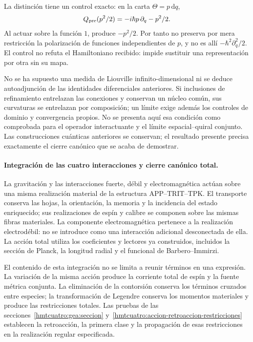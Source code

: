 La distinción tiene un control exacto: en la carta
\(\Theta=p\,\mathrm dq\),
\begin{equation}
 Q_{\rm pre}(p^2/2)=-i\hbar p\,\partial_q-p^2/2.
 \label{hmtcuatro:control-polarizacion}
\end{equation}
Al actuar sobre la función \(1\), produce \(-p^2/2\).
Por tanto no preserva por mera restricción la polarización de
funciones independientes de \(p\), y no es allí
\(-\hbar^2\partial_q^2/2\). El control no refuta el Hamiltoniano
recibido: impide sustituir una representación por otra sin su mapa.

No se ha supuesto una medida de Liouville infinito-dimensional ni
se deduce autoadjunción de las identidades diferenciales anteriores.
Si inclusiones de refinamiento entrelazan las conexiones y conservan
un núcleo común, sus curvaturas se entrelazan por composición; un
límite exige además los controles de dominio y convergencia propios.
No se presenta aquí esa condición como comprobada para el operador
interactuante y el límite espacial--quiral conjunto. Las construcciones
cuánticas anteriores se conservan; el resultado presente precisa
exactamente el cierre canónico que se acaba de demostrar.

\paragraph{Integración de las cuatro interacciones y cierre canónico total.}
La gravitación y las interacciones fuerte, débil y electromagnética
actúan sobre una misma realización material de la estructura
APP--TRIT--TPK. El transporte conserva las hojas, la orientación,
la memoria y la incidencia del estado enriquecido; sus realizaciones
de espín y calibre se componen sobre las mismas fibras materiales.
La componente electromagnética pertenece a la realización
electrodébil: no se introduce como una interacción adicional
desconectada de ella. La acción total utiliza los coeficientes y
lectores ya construidos, incluidos la sección de Planck, la longitud
radial y el funcional de Barbero--Immirzi.

El contenido de esta integración no se limita a reunir términos en
una expresión. La variación de la misma acción produce la corriente
total de espín y la fuente métrica conjunta. La eliminación de la
contorsión conserva los términos cruzados entre especies; la
transformación de Legendre conserva los momentos materiales y
produce las restricciones totales. Las pruebas de las
secciones~\ref{hmtcuatro:gea:seccion}
y~\ref{hmtcuatro:accion-retroaccion-restricciones}
establecen la retroacción, la primera clase y la propagación de
esas restricciones en la realización regular especificada.

